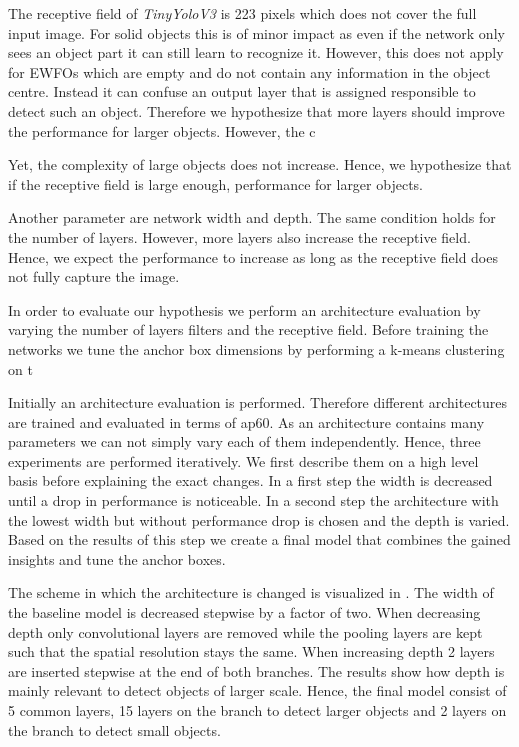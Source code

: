 The receptive field of \textit{TinyYoloV3} is 223 pixels which does not cover the full input image. For solid objects this is of minor impact as even if the network only sees an object part it can still learn to recognize it. However, this does not apply for \acp{EWFO} which are empty and do not contain any information in the object centre. Instead it can confuse an output layer that is assigned responsible to detect such an object. Therefore we hypothesize that more layers should improve the performance for larger objects. However, the c 

Yet, the complexity of large objects does not increase. Hence, we hypothesize that if the receptive field is large enough,  performance for larger objects. 

Another parameter are network width and depth.  The same condition holds for the number of layers. However, more layers also increase the receptive field. Hence, we expect the performance to increase as long as the receptive field does not fully capture the image.

In order to evaluate our hypothesis we perform an architecture evaluation by varying the number of layers filters and the receptive field. Before training the networks we tune the anchor box dimensions by performing a k-means clustering on t

Initially an architecture evaluation is performed. Therefore different architectures are trained and evaluated in terms of \ac{ap60}. As an architecture contains many parameters we can not simply vary each of them independently. Hence, three experiments are performed iteratively. We first describe them on a high level basis before explaining the exact changes. In a first step the width is decreased until a drop in performance is noticeable. In a second step the architecture with the lowest width but without performance drop is chosen and the depth is varied. Based on the results of this step we create a final model that combines the gained insights and tune the anchor boxes.

The scheme in which the architecture is changed is visualized in . The width of the baseline model is decreased stepwise by a factor of two. When decreasing depth only convolutional layers are removed while the pooling layers are kept such that the spatial resolution stays the same. When increasing depth 2 layers are inserted stepwise at the end of both branches. The results show how depth is mainly relevant to detect objects of larger scale. Hence, the final model consist of 5 common layers, 15 layers on the branch to detect larger objects and 2 layers on the branch to detect small objects.


